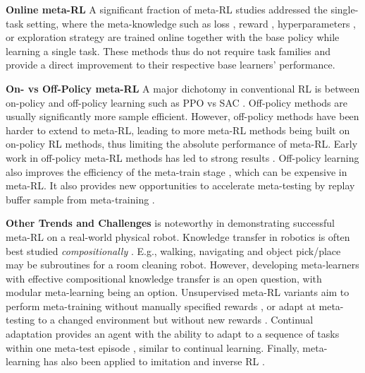 \documentclass[10pt,journal,compsoc]{IEEEtran}
\newcommand{\keypoint}[1]{\vspace{0.1cm}\noindent\textbf{#1}\quad}
\begin{document}
\keypoint{Online meta-RL}
A significant fraction of meta-RL studies addressed the single-task setting, where the meta-knowledge such as loss \cite{zhou2020online,veeriah2019discovery}, reward \cite{jaderberg2019poprl,zheng2018intrinsicrewardpg}, hyperparameters \cite{xu2018metagradient,young2019metaac}, or exploration strategy \cite{xu2018metaexplore} are trained online together with the base policy while learning a single task. These methods thus do not require task families and provide a direct improvement to their respective base learners' performance.

\keypoint{On- vs Off-Policy meta-RL} A major dichotomy in conventional RL is between on-policy and off-policy learning such as PPO \cite{schulman2017ppo} vs SAC \cite{haarnoja2018sac}. Off-policy methods are usually significantly more sample efficient. However, off-policy methods have been harder to extend to meta-RL, leading to  more meta-RL methods being built on on-policy RL methods, thus limiting the absolute performance of meta-RL. Early work in off-policy meta-RL methods has led to strong results \cite{fakoor2020metaq,zhou2020online,kirsch2020improving,rakelly2019pearl}. Off-policy learning also improves the efficiency of the meta-train stage \cite{rakelly2019pearl}, which can be expensive in meta-RL. It also provides new opportunities to accelerate meta-testing by replay buffer sample from meta-training  \cite{fakoor2020metaq}.

\keypoint{Other Trends and Challenges} %
\cite{clavera2019learning} is noteworthy in demonstrating successful meta-RL on a real-world physical robot. Knowledge transfer in robotics is often best studied \emph{compositionally} \cite{kroemer2019robotlearnreview}. E.g., walking, navigating and object pick/place may be subroutines for a room cleaning robot. However, developing meta-learners with effective compositional knowledge transfer  is an open question, with modular meta-learning \cite{alet2019modularmeta} being an option. Unsupervised meta-RL variants aim to perform meta-training without manually specified rewards \cite{jabri2019unsupervised}, or adapt at meta-testing to a changed environment but without new rewards \cite{yang2019norml}. Continual adaptation provides an agent with the ability to adapt to a sequence of tasks within one meta-test episode \cite{clavera2019learning,ritter2018episodicmeta,alshedivat2018nonstationarymeta}, similar to continual learning. Finally, meta-learning has also been applied to imitation \cite{duan2017one} and inverse RL \cite{ghasemipour2019smile}.
\end{document}
